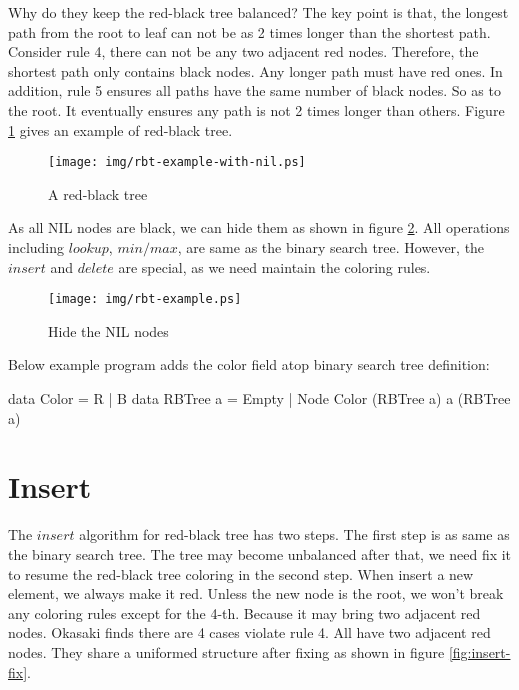 \documentclass[b5paper]{article}
\begin{document}
Why do they keep the red-black tree balanced? The key point is that, the longest path from the root to leaf can not be as 2 times longer than the shortest path. Consider rule 4, there can not be any two adjacent red nodes. Therefore, the shortest path only contains black nodes. Any longer path must have red ones. In addition, rule 5 ensures all paths have the same number of black nodes. So as to the root. It eventually ensures any path is not 2 times longer than others\cite{wiki-rbt}. Figure \ref{fig:rbt-example-with-nil} gives an example of red-black tree.

\begin{figure}[htbp]
  \centering
  \texttt{[image: img/rbt-example-with-nil.ps]}
  \caption{A red-black tree}
  \label{fig:rbt-example-with-nil}
\end{figure}

As all NIL nodes are black, we can hide them as shown in figure \ref{fig:rbt-example}. All operations including $lookup$, $min/max$, are same as the binary search tree. However, the $insert$ and $delete$ are special, as we need maintain the coloring rules.

\begin{figure}[htbp]
  \centering
  \texttt{[image: img/rbt-example.ps]}
  \caption{Hide the NIL nodes}
  \label{fig:rbt-example}
\end{figure}

Below example program adds the color field atop binary search tree definition:

\begin{Haskell}
data Color = R | B
data RBTree a = Empty
              | Node Color (RBTree a) a (RBTree a)
\end{Haskell}

\begin{Exercise}
\end{Exercise}

\section{Insert}

The $insert$ algorithm for red-black tree has two steps. The first step is as same as the binary search tree. The tree may become unbalanced after that, we need fix it to resume the red-black tree coloring in the second step. When insert a new element, we always make it red. Unless the new node is the root, we won't break any coloring rules except for the 4-th. Because it may bring two adjacent red nodes. Okasaki finds there are 4 cases violate rule 4. All have two adjacent red nodes. They share a uniformed structure after fixing\cite{okasaki} as shown in figure \ref{fig:insert-fix}.
\end{document}
